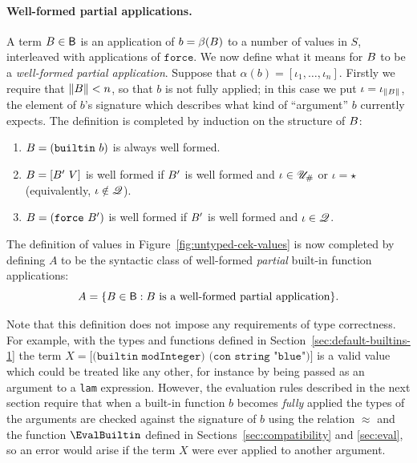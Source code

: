 \paragraph{Well-formed partial applications.} A term $B \in \mathsf{B}$ is
an application of $b = \beta(B)$ to a number of values in $S$, interleaved
with applications of $\texttt{force}$.  We now define what it means for $B$
to be a \textit{well-formed partial application}.  Suppose that $\alpha(b) =
[\iota_1, \ldots, \iota_n]$. Firstly we require that $\lVert B \rVert < n$, so
that $b$ is not fully applied; in this case we put
$\iota=\iota_{\lVert B \rVert}$, the element of $b$'s signature which describes
what kind of ``argument'' $b$ currently expects.  The definition is completed by
induction on the structure of $B$:
\begin{enumerate}
\item $B=\mathtt{(builtin}\ b \mathtt{)}$ is always well formed.
\item $\pba=\mathtt{[}\pba'\ V\mathtt{]}$ is well formed if $B'$ is
  well formed and $\iota \in {\mathscr{U}_{\#}}$ or $\iota = \star$ (equivalently, $\iota \notin \mathscr{Q}$).
\item $\pba=\mathtt{(force}\ \pba'\mathtt{)}$ is well formed if $B'$ is
  well formed and $\iota \in \mathscr{Q}$.
\end{enumerate}



\medskip
\noindent The definition of values in Figure~\ref{fig:untyped-cek-values} is now
completed by defining $A$ to be the syntactic class of well-formed
\textit{partial} built-in function applications:
$$
A = \{B \in \mathsf{B}: B \text{ is a well-formed partial application} \}.
$$

\noindent Note that this definition does not impose any requirements of type
correctness.  For example, with the types and functions defined in
Section~\ref{sec:default-builtins-1} the term $X =\texttt{[(builtin
    modInteger) (con string "blue")]}$ is a valid value which could be
treated like any other, for instance by being passed as an argument to a
\texttt{lam} expression.  However, the evaluation rules described in the next
section require that when a built-in function $b$ becomes \textit{fully} applied
the types of the arguments are checked against the signature of $b$ using the
relation $\approx$ and the function $\EvalBuiltin$ defined in
Sections~\ref{sec:compatibility} and \ref{sec:eval}, so an error would arise if
the term $X$ were ever applied to another argument.
